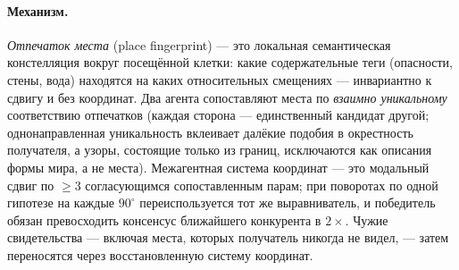 \documentclass{article}
\begin{document}
\paragraph{Механизм.} \emph{Отпечаток места} (place fingerprint) ---
это локальная семантическая констелляция вокруг посещённой клетки:
какие содержательные теги (опасности, стены, вода) находятся на каких
относительных смещениях --- инвариантно к сдвигу и без координат. Два
агента сопоставляют места по \emph{взаимно уникальному} соответствию
отпечатков (каждая сторона --- единственный кандидат другой;
однонаправленная уникальность вклеивает далёкие подобия в окрестность
получателя, а узоры, состоящие только из границ, исключаются как
описания формы мира, а не места). Межагентная система координат ---
это модальный сдвиг по $\ge 3$ согласующимся сопоставленным парам; при
поворотах по одной гипотезе на каждые $90^\circ$ переиспользуется тот
же выравниватель, и победитель обязан превосходить консенсус
ближайшего конкурента в $2\times$. Чужие свидетельства --- включая
места, которых получатель никогда не видел, --- затем переносятся
через восстановленную систему координат.
\end{document}
